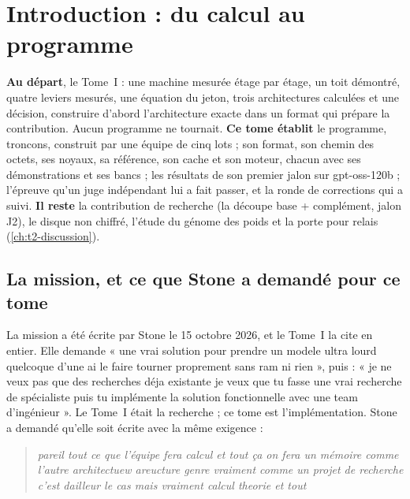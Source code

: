 
\chapter{Introduction : du calcul au programme}\label{ch:t2-intro}

\begin{origine}
\textbf{Au départ}, le Tome~I : une machine mesurée étage par étage, un toit démontré, quatre leviers mesurés, une équation du jeton, trois architectures calculées et une décision, construire d'abord l'architecture exacte dans un format qui prépare la contribution. Aucun programme ne tournait.
\textbf{Ce tome établit} le programme, troncons, construit par une équipe de cinq lots ; son format, son chemin des octets, ses noyaux, sa référence, son cache et son moteur, chacun avec ses démonstrations et ses bancs ; les résultats de son premier jalon sur gpt-oss-120b ; l'épreuve qu'un juge indépendant lui a fait passer, et la ronde de corrections qui a suivi.
\textbf{Il reste} la contribution de recherche (la découpe base + complément, jalon J2), le disque non chiffré, l'étude du génome des poids et la porte pour relais (\cref{ch:t2-discussion}).
\end{origine}

\section{La mission, et ce que Stone a demandé pour ce tome}\label{t2i-sec:mission}

La mission a été écrite par Stone le 15 octobre 2026, et le Tome~I la cite en entier. Elle demande « une vrai solution pour prendre un modele ultra lourd quelcoque d'une ai le faire tourner proprement sans ram ni rien », puis : « je ne veux pas que des recherches déja existante je veux que tu fasse une vrai recherche de spécialiste puis tu implémente la solution fonctionnelle avec une team d'ingénieur ». Le Tome~I était la recherche ; ce tome est l'implémentation. Stone a demandé qu'elle soit écrite avec la même exigence :

\begin{quote}\itshape
pareil tout ce que l'équipe fera calcul et tout ça on fera un mémoire comme l'autre architectuew areucture genre vraiment comme un projet de recherche c'est dailleur le cas mais vraiment calcul theorie et tout
\end{quote}

